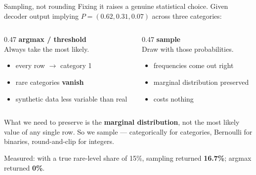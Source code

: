 \documentclass[aspectratio=169]{beamer}
\begin{document}
\begin{frame}{Sampling, not rounding}
  \small
  Fixing it raises a genuine statistical choice. Given decoder output implying
  $P = (0.62, 0.31, 0.07)$ across three categories:

  \vspace{0.5em}
  \begin{columns}[T,totalwidth=\textwidth]
    \begin{column}{0.47\textwidth}
      \textbf{argmax / threshold}\\
      Always take the most likely.
      \begin{itemize}
        \item every row $\to$ category 1
        \item rare categories \textbf{vanish}
        \item synthetic data less variable than real
      \end{itemize}
    \end{column}
    \begin{column}{0.47\textwidth}
      \textbf{sample}\\
      Draw with those probabilities.
      \begin{itemize}
        \item frequencies come out right
        \item marginal distribution preserved
        \item costs nothing
      \end{itemize}
    \end{column}
  \end{columns}

  \vspace{0.6em}
  What we need to preserve is the \textbf{marginal distribution}, not the most likely
  value of any single row. So we sample --- categorically for categories, Bernoulli
  for binaries, round-and-clip for integers.

  \vspace{0.4em}
  \small Measured: with a true rare-level share of 15\%, sampling returned
  \textbf{16.7\%}; argmax returned \textbf{0\%}.
\end{frame}
\end{document}
